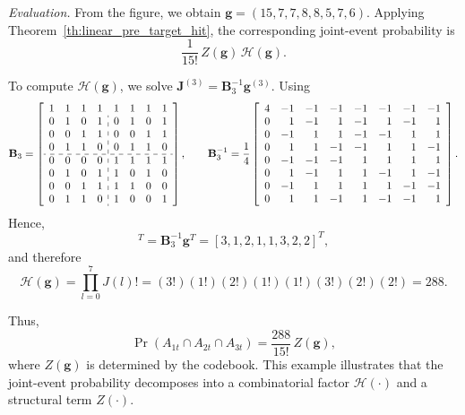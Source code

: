 \documentclass[letterpaper,draftclsnofoot,onecolumn]{IEEEtran}
\begin{document}
\noindent\textit{Evaluation.}
From the figure, we obtain $\mathbf{g}=(15,7,7,8,8,5,7,6)$. Applying Theorem~\ref{th:linear_pre_target_hit}, the corresponding joint-event probability is
\begin{equation}
\frac{1}{15!}\,Z(\mathbf{g})\,\mathcal{H}(\mathbf{g}).
\end{equation}

To compute $\mathcal{H}(\mathbf{g})$, we solve $\mathbf{J}^{(3)}=\mathbf{B}_3^{-1}\mathbf{g}^{(3)}$. Using
\begin{equation}
\mathbf{B}_3=
\left[\begin{array}{llll:llll}
1 & 1 & 1 & 1 & 1 & 1 & 1 & 1 \\
0 & 1 & 0 & 1 & 0 & 1 & 0 & 1 \\
0 & 0 & 1 & 1 & 0 & 0 & 1 & 1 \\
0 & 1 & 1 & 0 & 0 & 1 & 1 & 0 \\
\hdashline
0 & 0 & 0 & 0 & 1 & 1 & 1 & 1 \\
0 & 1 & 0 & 1 & 1 & 0 & 1 & 0 \\
0 & 0 & 1 & 1 & 1 & 1 & 0 & 0 \\
0 & 1 & 1 & 0 & 1 & 0 & 0 & 1
\end{array}\right],\qquad
\mathbf{B}_3^{-1}
=
\frac{1}{4}
\left[\begin{array}{rrrrrrrr}
4 & -1 & -1 & -1 & -1 & -1 & -1 & -1 \\
0 & 1 & -1 & 1 & -1 & 1 & -1 & 1 \\
0 & -1 & 1 & 1 & -1 & -1 & 1 & 1 \\
0 & 1 & 1 & -1 & -1 & 1 & 1 & -1 \\
0 & -1 & -1 & -1 & 1 & 1 & 1 & 1 \\
0 & 1 & -1 & 1 & 1 & -1 & 1 & -1 \\
0 & -1 & 1 & 1 & 1 & 1 & -1 & -1 \\
0 & 1 & 1 & -1 & 1 & -1 & -1 & 1
\end{array}\right].
\end{equation}
Hence,
\begin{equation}
[J(000),J(100),\ldots,J(111)]^T=\mathbf{B}_3^{-1}\mathbf{g}^T=[3,1,2,1,1,3,2,2]^T,
\end{equation}
and therefore
\begin{equation}
\mathcal{H}(\mathbf{g})=\prod_{l=0}^{7}J(l)!=(3!)(1!)(2!)(1!)(1!)(3!)(2!)(2!)=288.
\end{equation}

Thus,
\begin{equation}
\Pr(A_{1t}\cap A_{2t}\cap A_{3t})
=
\frac{288}{15!}\,Z(\mathbf{g}),
\end{equation}
where $Z(\mathbf{g})$ is determined by the codebook. This example illustrates that the joint-event probability decomposes into a combinatorial factor $\mathcal{H}(\cdot)$ and a structural term $Z(\cdot)$.
\end{document}
